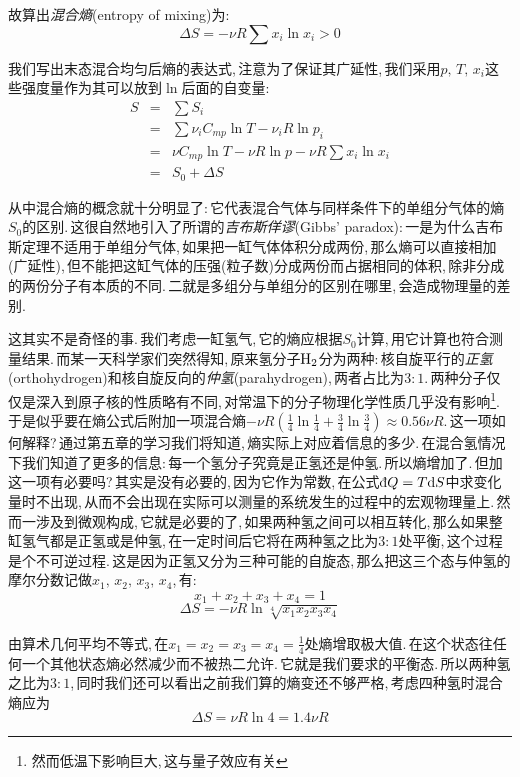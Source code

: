 故算出\emph{混合熵}(entropy of mixing)为:
\[\Delta S=-\nu R\sum x_i\ln x_i>0\]

我们写出末态混合均匀后熵的表达式,\,注意为了保证其广延性,\,我们采用$p,\,T,\,x_i$这些强度量作为其可以放到$\ln$后面的自变量:
\begin{eqnarray*}
S 	&=&	 \sum S_i \\
	&=&	\sum \nu_i C_{mp}\ln T-\nu_i R\ln p_i \\
	&=&	\nu C_{mp}\ln T-\nu R\ln p-\nu R\sum x_i\ln x_i \\
	&=&	S_0 +\Delta S
\end{eqnarray*}

从中混合熵的概念就十分明显了:\,它代表混合气体与同样条件下的单组分气体的熵$S_0$的区别.\,这很自然地引入了所谓的\emph{吉布斯佯谬}(Gibbs' paradox):\,一是为什么吉布斯定理不适用于单组分气体,\,如果把一缸气体体积分成两份,\,那么熵可以直接相加(广延性),\,但不能把这缸气体的压强(粒子数)分成两份而占据相同的体积,\,除非分成的两份分子有本质的不同.\,二就是多组分与单组分的区别在哪里,\,会造成物理量的差别.

这其实不是奇怪的事.\,我们考虑一缸氢气,\,它的熵应根据$S_0$计算,\,用它计算也符合测量结果.\,而某一天科学家们突然得知,\,原来氢分子${\rm H_2}$分为两种:\,核自旋平行的\emph{正氢}(orthohydrogen)和核自旋反向的\emph{仲氢}(parahydrogen),\,两者占比为$3:1$.\,两种分子仅仅是深入到原子核的性质略有不同,\,对常温下的分子物理化学性质几乎没有影响\footnote{然而低温下影响巨大,\,这与量子效应有关}.\,于是似乎要在熵公式后附加一项混合熵$\displaystyle -\nu R(\frac{1}{4}\ln\frac{1}{4}+\frac{3}{4}\ln\frac{3}{4})\approx 0.56\nu R$.\,这一项如何解释?\,通过第五章的学习我们将知道,\,熵实际上对应着信息的多少.\,在混合氢情况下我们知道了更多的信息:\,每一个氢分子究竟是正氢还是仲氢.\,所以熵增加了.\,但加这一项有必要吗?\,其实是没有必要的,\,因为它作为常数,\,在公式$\dbar Q=T\ud S$中求变化量时不出现,\,从而不会出现在实际可以测量的系统发生的过程中的宏观物理量上.\,然而一涉及到微观构成,\,它就是必要的了,\,如果两种氢之间可以相互转化,\,那么如果整缸氢气都是正氢或是仲氢,\,在一定时间后它将在两种氢之比为$3:1$处平衡,\,这个过程是个不可逆过程.\,这是因为正氢又分为三种可能的自旋态,\,那么把这三个态与仲氢的摩尔分数记做$x_1,\,x_2,\,x_3,\,x_4$,\,有:
\[x_1+x_2+x_3+x_4=1\]
\[\Delta S=-\nu R\ln\sqrt[4]{x_1x_2x_3x_4}\]

由算术几何平均不等式,\,在$\displaystyle x_1=x_2=x_3=x_4=\frac{1}{4}$处熵增取极大值.\,在这个状态往任何一个其他状态熵必然减少而不被热二允许.\,它就是我们要求的平衡态.\,所以两种氢之比为$3:1$,\,同时我们还可以看出之前我们算的熵变还不够严格,\,考虑四种氢时混合熵应为
\[\Delta S=\nu R\ln 4=1.4\nu R\]


